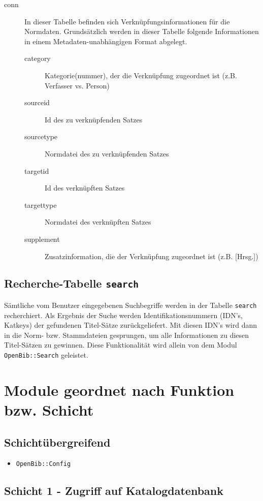 \documentclass[11pt, twoside, a4paper, BCOR8mm, DIV12, bibtotoc,idxtotoc]{scrbook}
\begin{document}
\begin{description}
\item[conn] In dieser Tabelle befinden sich
  Verknüpfungsinformationen für die Normdaten. 
  Grundsätzlich werden in dieser Tabelle folgende Informationen in
  einem Metadaten-unabhängigen Format abgelegt.
  \begin{description}
  \item[category] Kategorie(nummer), der die Verknüpfung zugeordnet
    ist (z.B. Verfasser vs. Person)
  \item[sourceid] Id des zu verknüpfenden Satzes
  \item[sourcetype] Normdatei des zu verknüpfenden Satzes
  \item[targetid] Id des verknüpften Satzes
  \item[targettype] Normdatei des verknüpften Satzes
  \item[supplement] Zusatzinformation, die der Verknüpfung zugeordnet
    ist (z.B. [Hrsg.])
  \end{description}
\end{description}


\section{Recherche-Tabelle \texttt{search}}

Sämtliche vom Benutzer eingegebenen Suchbegriffe werden in der Tabelle
\texttt{search} recherchiert. Als Ergebnis der Suche werden
Identifikationsnummern (IDN's, Katkeys) der gefundenen Titel-Sätze
zurückgeliefert. Mit diesen IDN's wird dann in die Norm- bzw.
Stammdateien gesprungen, um alle Informationen zu diesen Titel-Sätzen
zu gewinnen. Diese Funktionalität wird allein von dem Modul
\texttt{OpenBib::Search} geleistet.

\chapter{Module geordnet nach Funktion bzw. Schicht}


\section{Schichtübergreifend}


\begin{itemize}
\item \texttt{OpenBib::Config}
\end{itemize}

\section{Schicht 1 - Zugriff auf Katalogdatenbank}
\end{document}
